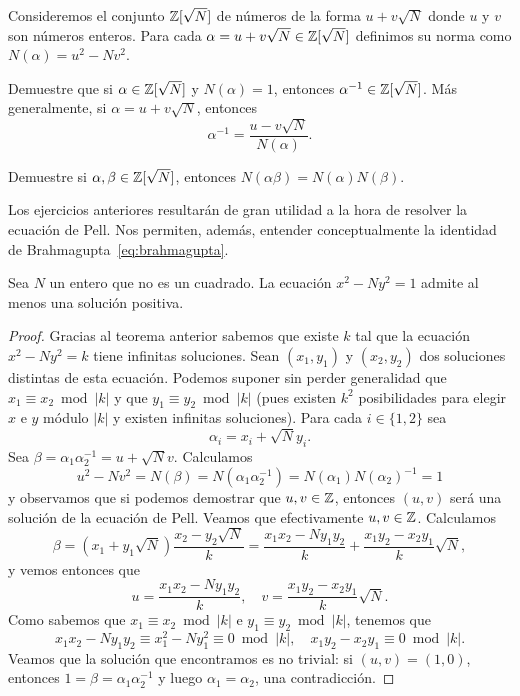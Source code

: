 Consideremos el conjunto $\mathbb{Z}[\sqrt{N}]$ de números de la forma $u+v\sqrt{N}$
donde $u$ y $v$ son números enteros.  Para cada
$\alpha=u+v\sqrt{N}\in\mathbb{Z}[\sqrt{N}]$ definimos su norma como
$N(\alpha)=u^2-Nv^2$. 

\begin{exercise}
	\label{xca:Pell}
	Demuestre que si $\alpha\in\mathbb{Z}[\sqrt{N}]$ y $N(\alpha)=1$, entonces
	$\alpha^{-1}\in\mathbb{Z}[\sqrt{N}]$. Más generalmente, si $\alpha=u+v\sqrt{N}$,
	entonces
	\[
		\alpha^{-1}=\frac{u-v\sqrt{N}}{N(\alpha)}.
	\]
\end{exercise}

\begin{exercise}
	Demuestre si $\alpha,\beta\in\mathbb{Z}[\sqrt{N}]$, entonces
	$N(\alpha\beta)=N(\alpha)N(\beta)$.
\end{exercise}

Los ejercicios anteriores resultarán de gran utilidad a la hora de resolver la
ecuación de Pell. Nos permiten, además, entender conceptualmente la identidad
de Brahmagupta~\eqref{eq:brahmagupta}. 

\begin{theorem}[Lagrange]
	Sea $N$ un entero que no es un cuadrado. La ecuación $x^2-Ny^2=1$ admite al
	menos una solución positiva. 
\end{theorem}

\begin{proof}
	Gracias al teorema anterior sabemos que existe $k$ tal que la ecuación
	$x^2-Ny^2=k$ tiene infinitas soluciones. Sean $(x_1,y_1)$ y $(x_2,y_2)$ dos
	soluciones distintas de esta ecuación. Podemos suponer sin perder generalidad que
	$x_1\equiv x_2\bmod{|k|}$ y que $y_1\equiv y_2\bmod{|k|}$ (pues existen
	$k^2$ posibilidades para elegir $x$ e $y$ módulo $|k|$ y existen infinitas
	soluciones). Para cada $i\in\{1,2\}$ sea 
	\[
		\alpha_i=x_i+\sqrt{N}y_i.
	\]
	Sea $\beta=\alpha_1\alpha_2^{-1}=u+\sqrt{N}v$. Calculamos 
	\[
		u^2-Nv^2=N(\beta)=N(\alpha_1\alpha_2^{-1})=N(\alpha_1)N(\alpha_2)^{-1}=1 
	\]
	y observamos que si podemos demostrar que $u,v\in\mathbb{Z}$, entonces $(u,v)$ será
	una solución de la ecuación de Pell. Veamos que efectivamente $u,v\in\mathbb{Z}$.
	Calculamos 
	\[
		\beta=(x_1+y_1\sqrt{N})\frac{x_2-y_2\sqrt{N}}{k}
		=\frac{x_1x_2-Ny_1y_2}{k}+\frac{x_1y_2-x_2y_1}{k}\sqrt{N},
	\]
	y vemos entonces que
	\[
	u=\frac{x_1x_2-Ny_1y_2}{k},
	\quad
	v=\frac{x_1y_2-x_2y_1}{k}\sqrt{N}.
	\]
	Como 
	sabemos que $x_1\equiv x_2\bmod{|k|}$ e $y_1\equiv y_2\bmod{|k|}$, tenemos que
	\[
		x_1x_2-Ny_1y_2\equiv x_1^2-Ny_1^2\equiv 0\bmod {|k|},\quad
		x_1y_2-x_2y_1\equiv 0\bmod{|k|}.
	\]
	Veamos que la solución que encontramos es no trivial: si $(u,v)=(1,0)$,
	entonces $1=\beta=\alpha_1\alpha_2^{-1}$ y luego $\alpha_1=\alpha_2$, una
	contradicción.
\end{proof}

